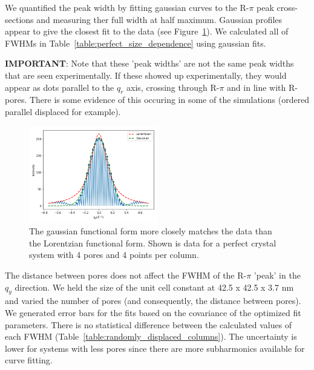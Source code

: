 \documentclass{article}
\begin{document}
  We quantified the peak width by fitting gaussian curves to the R-$\pi$ peak
  cross-sections and measuring ther full width at half maximum. Gaussian profiles
  appear to give the closest fit to the data (see Figure~\ref{fig:fwhm_fits}). We
  calculated all of FWHMs in Table~\ref{table:perfect_size_dependence} using gaussian
  fits.

  \textbf{IMPORTANT}: Note that these 'peak widths' are not the same peak widths that are seen 
  experimentally. If these showed up experimentally, they would appear as dots 
  parallel to the $q_r$ axis, crossing through R-$\pi$ and in line with R-pores.
  There is some evidence of this occuring in some of the simulations (ordered parallel 
  displaced for example).

  \begin{figure}[!htb]
  \centering
  \includegraphics[width=0.5\textwidth]{fwhm_fits.png}
  \caption{The gaussian functional form more closely matches the data than the Lorentzian
  functional form. Shown is data for a perfect crystal system with 4 pores and 4 points
  per column.}\label{fig:fwhm_fits}
  \end{figure}

  The distance between pores does not affect the FWHM of the R-$\pi$ 'peak' in
  the $q_y$ direction.  We held the size of the unit cell constant at 42.5 x 42.5
  x 3.7 nm and varied the number of pores (and consequently, the distance between
  pores). We generated error bars for the fits based on the covariance of the
  optimized fit parameters. There is no statistical difference between the
  calculated values of each FWHM (Table~\ref{table:randomly_displaced_columns}).
  The uncertainty is lower for systems with less pores since there are more
  subharmonics available for curve fitting. 

\end{document}
